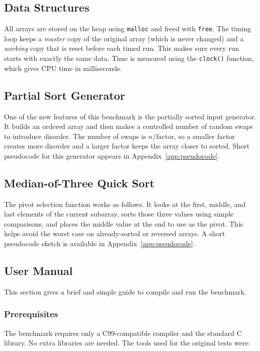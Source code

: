 \documentclass[12pt,a4paper]{article}
\theoremstyle{definition}
\begin{document}
\subsection{Data Structures}

All arrays are stored on the heap using \texttt{malloc} and freed with \texttt{free}. The timing loop keeps a \emph{master} copy of the original array (which is never changed) and a \emph{working} copy that is reset before each timed run. This makes sure every run starts with exactly the same data. Time is measured using the \texttt{clock()} function, which gives CPU time in milliseconds.

\subsection{Partial Sort Generator}

One of the new features of this benchmark is the partially sorted input generator. It builds an ordered array and then makes a controlled number of random swaps to introduce disorder. The number of swaps is $n / \text{factor}$, so a smaller factor creates more disorder and a larger factor keeps the array closer to sorted. Short pseudocode for this generator appears in Appendix~\ref{app:pseudocode}.

\subsection{Median-of-Three Quick Sort}

The pivot selection function works as follows. It looks at the first, middle, and last elements of the current subarray, sorts those three values using simple comparisons, and places the middle value at the end to use as the pivot. This helps avoid the worst case on already-sorted or reversed arrays. A short pseudocode sketch is available in Appendix~\ref{app:pseudocode}.

\subsection{User Manual}

This section gives a brief and simple guide to compile and run the benchmark.

\subsubsection*{Prerequisites}

The benchmark requires only a C99-compatible compiler and the standard C library. No extra libraries are needed. The tools used for the original tests were:
\end{document}
